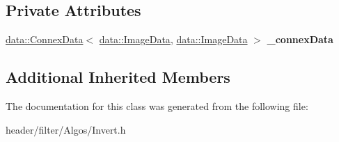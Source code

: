 \subsection*{Private Attributes}
\begin{DoxyCompactItemize}
\item 
\mbox{\label{classfilter_1_1algos_1_1_invert_adde7147440d10f9d4e9cb171f84389c6}} 
\hyperlink{classfilter_1_1data_1_1_connex_data}{data\+::\+Connex\+Data}$<$ \hyperlink{classfilter_1_1data_1_1_image_data}{data\+::\+Image\+Data}, \hyperlink{classfilter_1_1data_1_1_image_data}{data\+::\+Image\+Data} $>$ {\bfseries \+\_\+connex\+Data}
\end{DoxyCompactItemize}
\subsection*{Additional Inherited Members}


The documentation for this class was generated from the following file\+:\begin{DoxyCompactItemize}
\item 
header/filter/\+Algos/Invert.\+h\end{DoxyCompactItemize}
